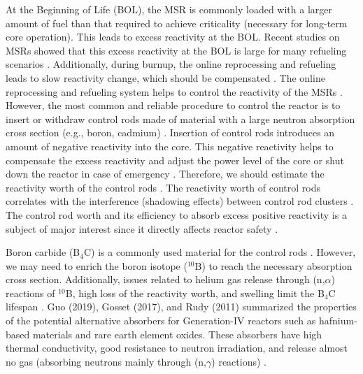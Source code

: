 At the Beginning of Life (BOL), the MSR is commonly loaded with a larger amount of 
fuel than that required to achieve criticality (necessary for long-term core 
operation). This leads to excess reactivity at the BOL. Recent studies on MSRs showed that this excess reactivity 
at the BOL is large for many refueling scenarios 
\cite{ashraf2020Strategies,ashraf2020whole,rykhlevskii2019modeling,betzler2016modeling,ashraf2018nuclear,ashraf2019modeling}.
Additionally, during burnup, the online 
reprocessing and refueling leads to slow reactivity change, which 
should be compensated \cite{ashraf2020Strategies,ashraf2020whole}. 
The online reprocessing and refueling system helps to control the reactivity of 
the MSRs \cite{ashraf2020whole,ashraf2019Preliminary}. However, the most common and reliable procedure 
to control the reactor is to insert or withdraw control rods made of material 
with a large neutron absorption cross section (e.g., boron, cadmium) 
\cite{duderstadt650nuclear}. 
Insertion of control rods introduces an amount of negative reactivity into the 
core. This negative reactivity helps to compensate the excess reactivity and 
adjust the power level of the core or shut down the reactor in case of 
emergency \cite{glasstone1967nuclear}. Therefore, we should estimate 
the reactivity worth of the control rods 
\cite{varvayanni2009estimation,fadaei2009control,aoyama2007core,bretscher1997computing}.
 The reactivity worth of control rods correlates with the interference 
(shadowing effects) between control rod clusters 
\cite{girardin2008development,vcerba2017optimization}. 
The control rod worth and its efficiency to absorb excess positive reactivity is a subject of major interest since it directly affects reactor safety \cite{liu2018criticality,atkinson2019small,vcerba2017optimization,do2019criticality,guo2019advanced,varvayanni2009estimation}.

Boron carbide (B$_4$C) is a commonly used material for the control rods 
\cite{zhong2019preliminary,steinbruck2010degradation,dunner1984absorber}. 
However, we may need to enrich the boron isotope ($^{10}$B) to reach 
the necessary absorption cross section. Additionally, issues related to helium gas release through (n,$\alpha$) reactions of $^{10}$B, high loss of the reactivity worth, and swelling limit the B$_4$C lifespan 
\cite{guo2019optimized}. Guo (2019), Gosset (2017), and Rudy (2011) summarized the properties of the 
potential alternative absorbers for Generation-IV reactors such as 
hafnium-based materials and rare earth element oxides. These absorbers have 
high thermal conductivity, good resistance to neutron irradiation, and release 
almost no gas (absorbing neutrons mainly through (n,$\gamma$) reactions)
\cite{guo2019optimized,gosset2017absorber,konings2011comprehensive}.

